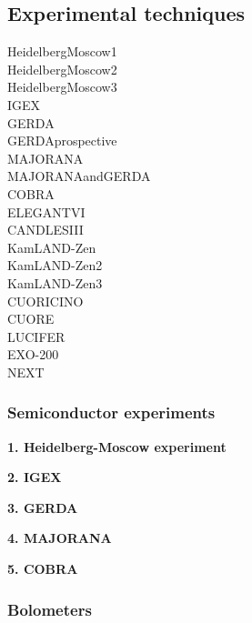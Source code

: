 \documentclass[main.tex]{subfiles}
\begin{document}
\subsection{Experimental techniques}

HeidelbergMoscow1 \cite{HeidelbergMoscow1} \\
HeidelbergMoscow2 \cite{HeidelbergMoscow2} \\
HeidelbergMoscow3 \cite{HeidelbergMoscow3} \\

IGEX \cite{IGEX} \\
GERDA \cite{GERDA} \\
GERDAprospective \cite{GERDAprospective} \\
MAJORANA \cite{MAJORANA} \\
MAJORANAandGERDA \cite{MAJORANAandGERDA} \\
COBRA \cite{COBRA} \\
ELEGANTVI \cite{ELEGANTVI} \\
CANDLESIII \cite{CANDLESIII} \\
KamLAND-Zen \cite{KamLAND-Zen} \\
KamLAND-Zen2 \cite{KamLAND-Zen2} \\
KamLAND-Zen3 \cite{KamLAND-Zen3} \\

CUORICINO \cite{CUORICINO} \\
CUORE \cite{CUORE} \\
LUCIFER \cite{LUCIFER} \\
EXO-200 \cite{EXO-200} \\
NEXT \cite{NEXT}





\subsubsection{Semiconductor experiments}

\NI \textbf{1. Heidelberg-Moscow experiment}

\bigskip

\NI \textbf{2. IGEX}

\bigskip

\NI \textbf{3. GERDA}

\bigskip

\NI \textbf{4. MAJORANA}

\bigskip

\NI \textbf{5. COBRA}

\subsubsection{Bolometers}
\end{document}
